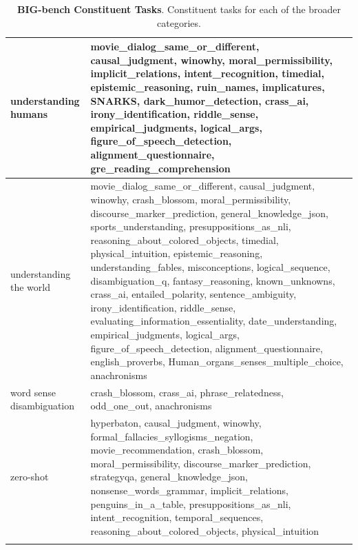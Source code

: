 \documentclass[11pt, a4paper, logo, internal, copyright, nonumbering]{deepmind}
\begin{document}
\begin{xltabular}{\textwidth}{X|X}
understanding humans & movie\_dialog\_same\_or\_different, causal\_judgment, winowhy, moral\_permissibility, implicit\_relations, intent\_recognition, timedial, epistemic\_reasoning, ruin\_names, implicatures, SNARKS, dark\_humor\_detection, crass\_ai, irony\_identification, riddle\_sense, empirical\_judgments, logical\_args, figure\_of\_speech\_detection, alignment\_questionnaire, gre\_reading\_comprehension \\ \hline
understanding the world & movie\_dialog\_same\_or\_different, causal\_judgment, winowhy, crash\_blossom, moral\_permissibility, discourse\_marker\_prediction, general\_knowledge\_json, sports\_understanding, presuppositions\_as\_nli, reasoning\_about\_colored\_objects, timedial, physical\_intuition, epistemic\_reasoning, understanding\_fables, misconceptions, logical\_sequence, disambiguation\_q, fantasy\_reasoning, known\_unknowns, crass\_ai, entailed\_polarity, sentence\_ambiguity, irony\_identification, riddle\_sense, evaluating\_information\_essentiality, date\_understanding, empirical\_judgments, logical\_args, figure\_of\_speech\_detection, alignment\_questionnaire, english\_proverbs, Human\_organs\_senses\_multiple\_choice, anachronisms \\ \hline
word sense disambiguation & crash\_blossom, crass\_ai, phrase\_relatedness, odd\_one\_out, anachronisms \\ \hline
zero-shot & hyperbaton, causal\_judgment, winowhy, formal\_fallacies\_syllogisms\_negation, movie\_recommendation, crash\_blossom, moral\_permissibility, discourse\_marker\_prediction, strategyqa, general\_knowledge\_json, nonsense\_words\_grammar, implicit\_relations, penguins\_in\_a\_table, presuppositions\_as\_nli, intent\_recognition, temporal\_sequences, reasoning\_about\_colored\_objects, physical\_intuition \\ \hline
\caption{\textbf{BIG-bench Constituent Tasks}. Constituent tasks for each of the broader categories.}
\label{tab:tasks_per_category}
\end{xltabular}
\normalsize
\end{document}
